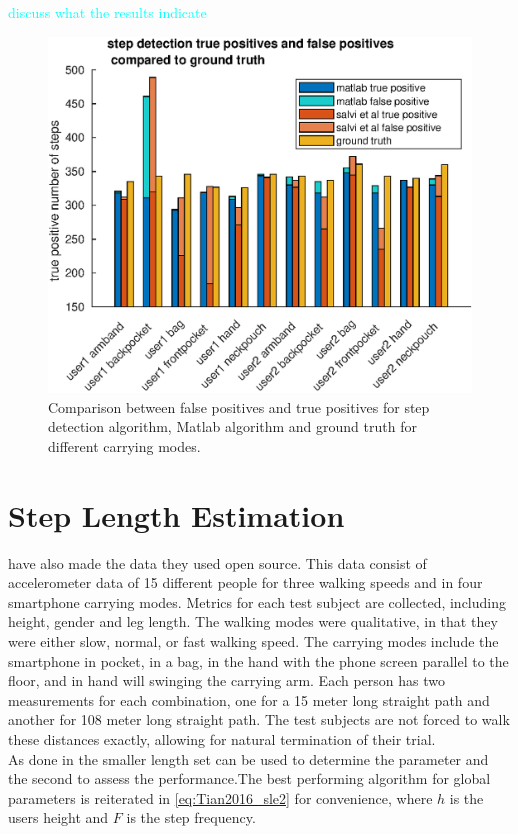 \textcolor{cyan}{discuss what the results indicate}

\begin{figure}
	\centering
	\includegraphics[width=0.7\linewidth]{images/20200930_1510_tp_fp_abs_comparison}
\caption[False positives and true positives step detection comparison]{Comparison between false positives and true positives for \citet{Salvi2018} step detection algorithm, Matlab algorithm and ground truth for different carrying modes.}
\label{fig:sd_tp_fp_comparison}
\end{figure}

\newpage

\section{Step Length Estimation}

\citet{Vezocnik2019} have also made the data they used open source. This data consist of accelerometer data of 15 different people for three walking speeds and in four smartphone carrying modes. Metrics for each test subject are collected, including height, gender and leg length. The walking modes were qualitative, in that they were either slow, normal, or fast walking speed. The carrying modes include the smartphone in pocket, in a bag, in the hand with the phone screen parallel to the floor, and in hand will swinging the carrying arm. Each person has two measurements for each combination, one for a 15 meter long straight path and another for 108 meter long straight path. The test subjects are not forced to walk these distances exactly, allowing for natural termination of their trial. \\
As done in \cite{Vezocnik2019} the smaller length set can be used to determine the parameter and the second to assess the performance.The best performing algorithm for global parameters is reiterated in \cref{eq:Tian2016_sle2} for convenience, where $h$ is the users height and $F$ is the step frequency. 

